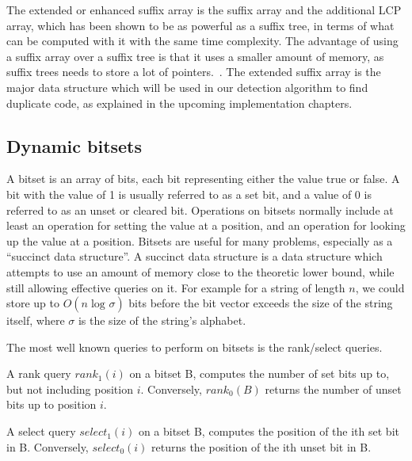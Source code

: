The extended or enhanced suffix array is the suffix array and the additional LCP array,
which has been shown to be as powerful as a suffix tree, in terms of what can be computed
with it with the same time complexity. The advantage of using a suffix array over a suffix
tree is that it uses a smaller amount of memory, as suffix trees needs to store a lot of
pointers.~\cite{ReplaceSuffixTreeWithEnchancedSuffixArray}. The extended suffix array is
the major data structure which will be used in our detection algorithm to find duplicate
code, as explained in the upcoming implementation chapters.

 \subsection*{Dynamic bitsets}

A bitset is an array of bits, each bit representing either the value true or false. A bit
with the value of 1 is usually referred to as a set bit, and a value of 0 is referred to
as an unset or cleared bit. Operations on bitsets normally include at least an operation
for setting the value at a position, and an operation for looking up the value at a
position. Bitsets are useful for many problems, especially as a ``succinct data
structure''. A succinct data structure is a data structure which attempts to use an amount
of memory close to the theoretic lower bound, while still allowing effective queries on
it. For example for a string of length $n$, we could store up to $O(n \log_{}\sigma)$ bits
before the bit vector exceeds the size of the string itself, where $\sigma$ is the size of
the string's alphabet.

The most well known queries to perform on bitsets is the rank/select queries.

\begin{definition}

    A rank query $rank_1(i)$ on a bitset B, computes the number of set bits up to, but not
    including position $i$. Conversely, $rank_0(B)$ returns the number of unset bits up to
    position $i$.

\end{definition}
\begin{definition}
    
    A select query $select_1(i)$ on a bitset B, computes the position of the ith set bit
    in B. Conversely, $select_0(i)$ returns the position of the ith unset bit in B.

\end{definition}

